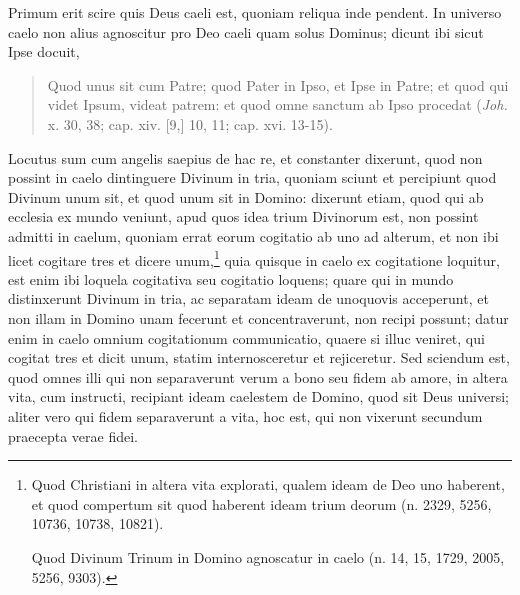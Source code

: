 
\begin{topic}{2}
    Primum erit scire quis Deus caeli est, quoniam reliqua inde pendent.
    In universo caelo non alius agnoscitur pro Deo caeli quam solus Dominus; dicunt ibi sicut Ipse docuit,
    \begin{quote}
        Quod unus sit cum Patre; quod Pater in Ipso, et Ipse in Patre; et quod qui videt Ipsum, videat patrem: et quod
        omne sanctum ab Ipso procedat (\emph{Joh.} x. 30, 38; cap. xiv. [9,] 10, 11; cap. xvi. 13-15).
    \end{quote}
    Locutus sum cum angelis saepius de hac re, et constanter dixerunt, quod non possint in caelo dintinguere Divinum in
    tria, quoniam sciunt et percipiunt quod Divinum unum sit, et quod unum sit in Domino: dixerunt etiam, quod qui ab
    ecclesia ex mundo veniunt, apud quos idea trium Divinorum est, non possint admitti in caelum, quoniam errat eorum
    cogitatio ab uno ad alterum, et non ibi licet cogitare tres et dicere unum,\footnote{Quod Christiani in altera vita
    explorati, qualem ideam de Deo uno haberent, et quod compertum sit quod haberent ideam trium deorum (n. 2329, 5256,
    10736, 10738, 10821).

    Quod Divinum Trinum in Domino agnoscatur in caelo (n. 14, 15, 1729, 2005, 5256, 9303).} quia quisque in caelo ex
    cogitatione loquitur, est enim ibi loquela cogitativa seu cogitatio loquens; quare qui in mundo distinxerunt Divinum
    in tria, ac separatam ideam de unoquovis acceperunt, et non illam in Domino unam fecerunt et concentraverunt, non
    recipi possunt; datur enim in caelo omnium cogitationum communicatio, quaere si illuc veniret, qui cogitat tres et
    dicit unum, statim internosceretur et rejiceretur.
    Sed sciendum est, quod omnes illi qui non separaverunt verum a bono seu fidem ab amore, in altera vita, cum
    instructi, recipiant ideam caelestem de Domino, quod sit Deus universi; aliter vero qui fidem separaverunt a vita,
    hoc est, qui non vixerunt secundum praecepta verae fidei.
\end{topic}

